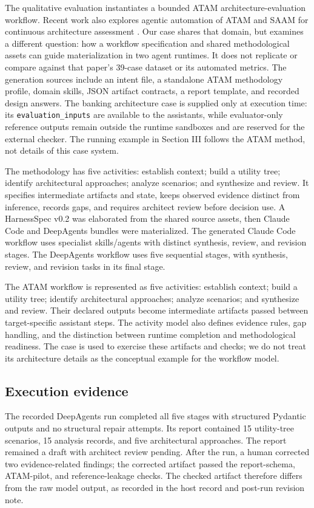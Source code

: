 \documentclass[10pt,conference]{IEEEtran}
\begin{document}
The qualitative evaluation instantiates a bounded ATAM architecture-evaluation workflow. Recent work also explores agentic automation of ATAM and SAAM for continuous architecture assessment \cite{atamagents}. Our case shares that domain, but examines a different question: how a workflow specification and shared methodological assets can guide materialization in two agent runtimes. It does not replicate or compare against that paper's 39-case dataset or its automated metrics. The generation sources include an intent file, a standalone ATAM methodology profile, domain skills, JSON artifact contracts, a report template, and recorded design answers. The banking architecture case is supplied only at execution time: its \texttt{evaluation\_inputs} are available to the assistants, while evaluator-only reference outputs remain outside the runtime sandboxes and are reserved for the external checker. The running example in Section III follows the ATAM method, not details of this case system.

The methodology has five activities: establish context; build a utility tree; identify architectural approaches; analyze scenarios; and synthesize and review. It specifies intermediate artifacts and state, keeps observed evidence distinct from inference, records gaps, and requires architect review before decision use. A HarnessSpec v0.2 was elaborated from the shared source assets, then Claude Code and DeepAgents bundles were materialized. The generated Claude Code workflow uses specialist skills/agents with distinct synthesis, review, and revision stages. The DeepAgents workflow uses five sequential stages, with synthesis, review, and revision tasks in its final stage.

The ATAM workflow is represented as five activities: establish context; build a utility tree; identify architectural approaches; analyze scenarios; and synthesize and review. Their declared outputs become intermediate artifacts passed between target-specific assistant steps. The activity model also defines evidence rules, gap handling, and the distinction between runtime completion and methodological readiness. The case is used to exercise these artifacts and checks; we do not treat its architecture details as the conceptual example for the workflow model.

\subsection{Execution evidence}

The recorded DeepAgents run completed all five stages with structured Pydantic outputs and no structural repair attempts. Its report contained 15 utility-tree scenarios, 15 analysis records, and five architectural approaches. The report remained a draft with architect review pending. After the run, a human corrected two evidence-related findings; the corrected artifact passed the report-schema, ATAM-pilot, and reference-leakage checks. The checked artifact therefore differs from the raw model output, as recorded in the host record and post-run revision note.
\end{document}
